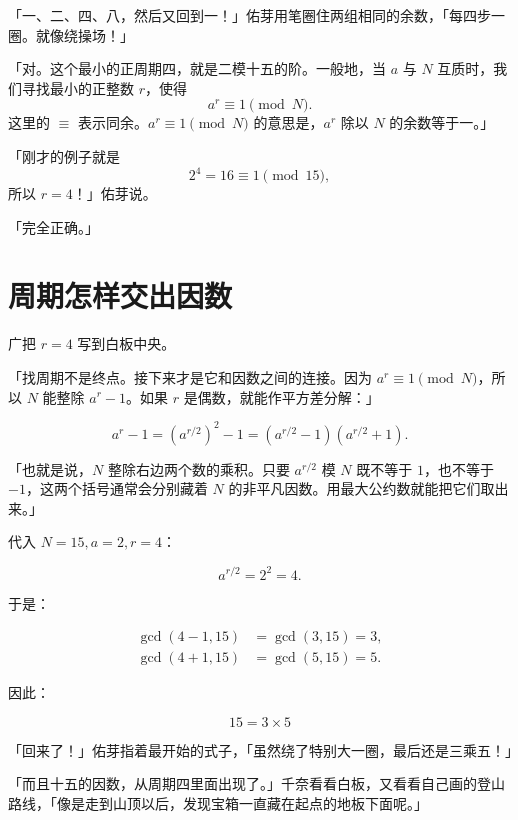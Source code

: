 「一、二、四、八，然后又回到一！」佑芽用笔圈住两组相同的余数，「每四步一圈。就像绕操场！」

「对。这个最小的正周期四，就是二模十五的阶。一般地，当 $a$ 与 $N$ 互质时，我们寻找最小的正整数 $r$，使得
\begin{equation}
a^r \equiv 1 \pmod N.
\end{equation}
这里的 $\equiv$ 表示同余。$a^r \equiv 1 \pmod N$ 的意思是，$a^r$ 除以 $N$ 的余数等于一。」

「刚才的例子就是
\begin{equation}
2^4=16\equiv 1 \pmod {15},
\end{equation}
所以 $r=4$！」佑芽说。

「完全正确。」

\section{周期怎样交出因数}

广把 $r=4$ 写到白板中央。

「找周期不是终点。接下来才是它和因数之间的连接。因为 $a^r\equiv1\pmod N$，所以 $N$ 能整除 $a^r-1$。如果 $r$ 是偶数，就能作平方差分解：」

\begin{equation}
a^r-1=\left(a^{r/2}\right)^2-1
=\left(a^{r/2}-1\right)\left(a^{r/2}+1\right).
\end{equation}

「也就是说，$N$ 整除右边两个数的乘积。只要 $a^{r/2}$ 模 $N$ 既不等于 $1$，也不等于 $-1$，这两个括号通常会分别藏着 $N$ 的非平凡因数。用最大公约数就能把它们取出来。」

代入 $N=15,a=2,r=4$：

\begin{equation}
a^{r/2}=2^2=4.
\end{equation}

于是：

\begin{align}
\gcd(4-1,15)&=\gcd(3,15)=3,\\
\gcd(4+1,15)&=\gcd(5,15)=5.
\end{align}

因此：

\begin{equation}
\boxed{15=3\times5}
\end{equation}

「回来了！」佑芽指着最开始的式子，「虽然绕了特别大一圈，最后还是三乘五！」

「而且十五的因数，从周期四里面出现了。」千奈看看白板，又看看自己画的登山路线，「像是走到山顶以后，发现宝箱一直藏在起点的地板下面呢。」

